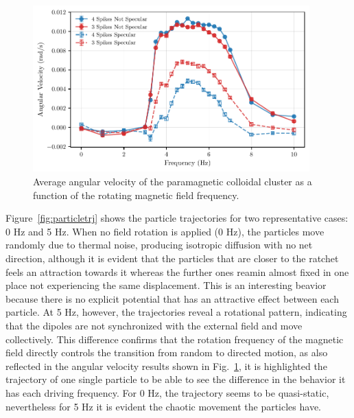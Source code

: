 \begin{figure}[h]
\begin{center}
\includegraphics[width=0.95\textwidth]{figures/AvsF.pdf}
\end{center}
\caption[Angular velocity as a function of driving frequency.]
{Average angular velocity of the paramagnetic colloidal cluster as a function of the rotating magnetic field frequency.}
\label{fig:angularvsfrequency}
\end{figure}


Figure~\ref{fig:particletrj} shows the particle trajectories for two representative cases: 0 Hz and 5 Hz. When no field rotation is applied (0 Hz), the particles move randomly due to thermal noise, producing isotropic diffusion with no net direction, although it is evident that the particles that are closer to the ratchet feels an attraction towards it whereas the further ones reamin almost fixed in one place not experiencing the same displacement. This is an interesting beavior because there is no explicit potential that has an attractive effect between each particle. At 5 Hz, however, the trajectories reveal a rotational pattern, indicating that the dipoles are not synchronized with the external field and move collectively. This difference confirms that the rotation frequency of the magnetic field directly controls the transition from random to directed motion, as also reflected in the angular velocity results shown in Fig.~\ref{fig:angularvsfrequency}, it is highlighted the trajectory of one single particle to be able to see the difference in the behavior it has each driving frequency. For 0 Hz, the trajectory seems to be quasi-static, nevertheless for 5 Hz it is evident the chaotic movement the particles have.

